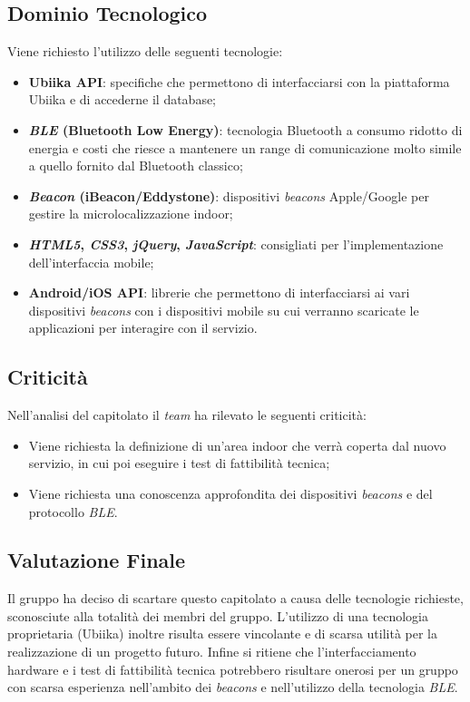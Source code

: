 \subsection{Dominio Tecnologico}
Viene richiesto l'utilizzo delle seguenti tecnologie:
\begin{itemize}
\item \textbf{Ubiika API}: specifiche che permettono di interfacciarsi con la piattaforma Ubiika e di accederne il database;
\item \textbf{\textit{BLE} (Bluetooth Low Energy)}: tecnologia Bluetooth a consumo ridotto di energia e costi che riesce a mantenere un range di comunicazione molto simile a quello fornito dal Bluetooth classico;
\item \textbf{\textit{Beacon} (iBeacon/Eddystone)}: dispositivi \textit{beacons} Apple/Google per gestire la microlocalizzazione indoor;
\item \textbf{\textit{HTML5}, \textit{CSS3}, \textit{jQuery}, \textit{JavaScript}}: consigliati per l'implementazione dell'interfaccia mobile;
\item \textbf{Android/iOS API}: librerie che permettono di interfacciarsi ai vari dispositivi \textit{beacons} con i dispositivi mobile su cui verranno scaricate le applicazioni per interagire con il servizio.
\end{itemize}


\subsection{Criticità}
Nell'analisi del capitolato il \textit{team} ha rilevato le seguenti criticità:
\begin{itemize}
\item Viene richiesta la definizione di un'area indoor che verrà coperta dal nuovo servizio, in cui poi eseguire i test di fattibilità tecnica;
\item Viene richiesta una conoscenza approfondita dei dispositivi \textit{beacons} e del protocollo \textit{BLE}.
\end{itemize}


\subsection{Valutazione Finale}
Il gruppo ha deciso di scartare questo capitolato a causa delle tecnologie richieste, sconosciute alla totalità dei membri del gruppo. L'utilizzo di una tecnologia proprietaria (Ubiika) inoltre risulta essere vincolante e di scarsa utilità per la realizzazione di un progetto futuro. Infine si ritiene che l'interfacciamento hardware e i test di fattibilità tecnica potrebbero risultare onerosi per un gruppo con scarsa esperienza nell'ambito dei \textit{beacons} e nell'utilizzo della tecnologia \textit{BLE}.
